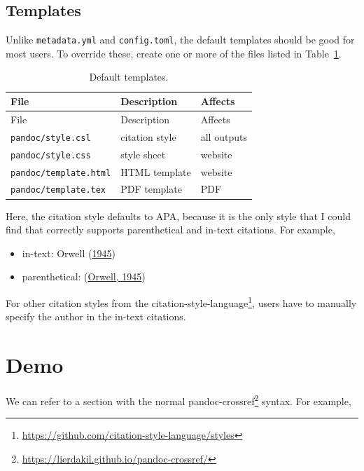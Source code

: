\documentclass[
  notoc %
]{tufte-book}
\DeclareRobustCommand{\href}[2]{#2\footnote{\url{#1}}}
\providecommand{\tightlist}{%
  \setlength{\itemsep}{0pt}\setlength{\parskip}{0pt}
}
\newcommand{\passthrough}[1]{#1}
\begin{document}
\hypertarget{sec:templates}{%
\section{Templates}\label{sec:templates}}

Unlike \passthrough{\lstinline!metadata.yml!} and
\passthrough{\lstinline!config.toml!}, the default templates should be
good for most users. To override these, create one or more of the files
listed in Table~\ref{tbl:templates}.

\hypertarget{tbl:templates}{}
\begin{longtable}[]{@{}lll@{}}
\caption{\label{tbl:templates}Default templates.}\tabularnewline
\toprule()
File & Description & Affects \\
\midrule()
\endfirsthead
\toprule()
File & Description & Affects \\
\midrule()
\endhead
\passthrough{\lstinline!pandoc/style.csl!} & citation style & all
outputs \\
\passthrough{\lstinline!pandoc/style.css!} & style sheet & website \\
\passthrough{\lstinline!pandoc/template.html!} & HTML template &
website \\
\passthrough{\lstinline!pandoc/template.tex!} & PDF template & PDF \\
\bottomrule()
\end{longtable}

Here, the citation style defaults to APA, because it is the only style
that I could find that correctly supports parenthetical and in-text
citations. For example,

\begin{itemize}
\tightlist
\item
  in-text: Orwell (\protect\hyperlink{ref-orwell1945animal}{1945})
\item
  parenthetical: (\protect\hyperlink{ref-orwell1945animal}{Orwell,
  1945})
\end{itemize}

For other citation styles from the
\href{https://github.com/citation-style-language/styles}{citation-style-language},
users have to manually specify the author in the in-text citations.

\hypertarget{sec:demo}{%
\chapter{Demo}\label{sec:demo}}

We can refer to a section with the normal
\href{https://lierdakil.github.io/pandoc-crossref/}{pandoc-crossref}
syntax. For example,
\end{document}
